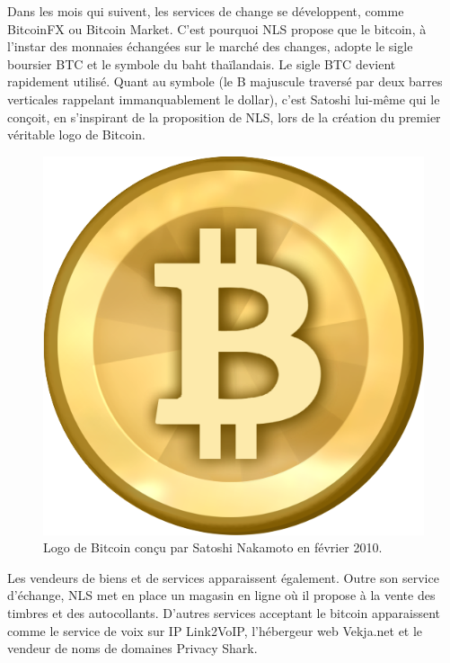Dans les mois qui suivent, les services de change se développent, comme BitcoinFX ou Bitcoin Market. C'est pourquoi NLS propose que le bitcoin, à l'instar des monnaies échangées sur le marché des changes, adopte le sigle boursier BTC et le symbole du baht thaïlandais. Le sigle BTC devient rapidement utilisé. Quant au symbole (le B majuscule traversé par deux barres verticales rappelant immanquablement le dollar), c'est Satoshi lui-même qui le conçoit, en s'inspirant de la proposition de NLS, lors de la création du premier véritable logo de Bitcoin.

\begin{figure}[h]
  \centering
  \includegraphics[scale=0.15]{img/bitcoin530.png}
  \caption{Logo de Bitcoin conçu par Satoshi Nakamoto en février 2010.}
\end{figure}

Les vendeurs de biens et de services apparaissent également. Outre son service d'échange, NLS met en place un magasin en ligne où il propose à la vente des timbres et des autocollants. D'autres services acceptant le bitcoin apparaissent comme le service de voix sur IP Link2VoIP, l'hébergeur web Vekja.net et le vendeur de noms de domaines Privacy Shark.

